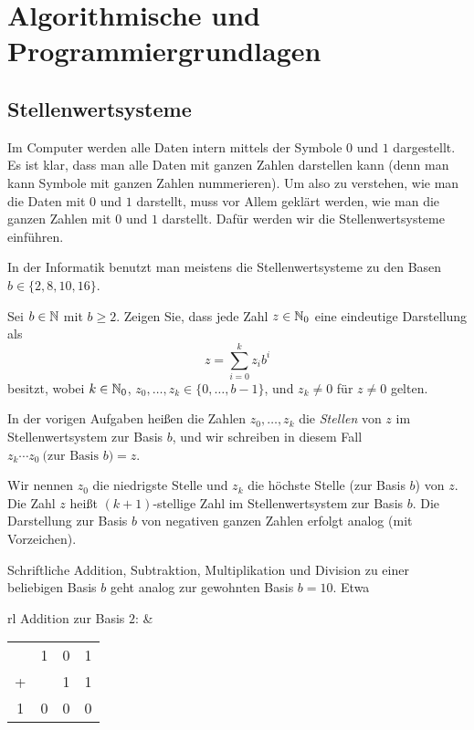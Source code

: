 \chapter{Algorithmische und Programmiergrundlagen}



\section{Stellenwertsysteme}

\begin{bem} 
Im Computer werden alle Daten intern mittels der Symbole $0$ und $1$ dargestellt. Es ist klar, dass man alle Daten mit ganzen Zahlen darstellen kann (denn man kann Symbole mit ganzen Zahlen nummerieren). Um also zu verstehen, wie man die Daten mit $0$ und $1$ darstellt, muss vor Allem geklärt werden, wie man die ganzen Zahlen mit $0$ und $1$ darstellt. Dafür werden wir die Stellenwertsysteme einführen. 

In der Informatik benutzt man meistens die Stellenwertsysteme zu den Basen $b \in \{2,8,10,16\}$.
\end{bem} 

\begin{aufg}
	Sei $b \in \mathbb{N}$ mit $b \ge 2$. Zeigen Sie, dass jede Zahl $z \in \mathbb{N}_0$ eine eindeutige Darstellung als 
	\begin{equation}
		\label{z:zur:Basis:b}
		z = \sum_{i=0}^k z_i b^i
	\end{equation}
	besitzt, wobei $k \in \mathbb{N}_0$, $z_0,\ldots,z_k \in \{0,\ldots,b-1\}$, und $z_k \ne 0$ für $z \ne 0$ gelten. 
\end{aufg}

\begin{defn} 
In der vorigen Aufgaben heißen die Zahlen $z_0,\ldots,z_k$ die \emph{Stellen} von $z$ im Stellenwertsystem zur Basis $b$, und wir schreiben in diesem Fall 
${z_k\cdots z_0} \ \text{(zur Basis $b$)} = z$. 

Wir nennen $z_0$ die niedrigste Stelle und $z_k$ die höchste Stelle (zur Basis $b$) von $z$. Die Zahl $z$ heißt $(k+1)$-stellige Zahl im Stellenwertsystem zur Basis $b$. Die Darstellung zur Basis $b$ von negativen ganzen Zahlen erfolgt analog (mit Vorzeichen). 
\end{defn} 

\begin{bsp}
	Schriftliche Addition, Subtraktion, Multiplikation und Division zu einer beliebigen Basis $b$ geht analog zur gewohnten Basis $b=10$. Etwa
	\begin{center}
		\begin{tabular}{rl}
			Addition zur Basis $2$:\hspace{3em} &
			\begin{tabular}{cccc}
				& 1 & 0 & 1
				\\	+ & & 1 & 1
				\\ \hline
				1 & 0 & 0 & 0
			\end{tabular}
		\end{tabular}
	\end{center}
\end{bsp}

